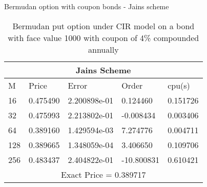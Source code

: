 \documentclass{beamer}
\begin{document}
 
  \begin{frame}{Bermudan option with coupon bonds - Jains scheme}
    \begin{table}[htp]
    \begin{tabular}{ |p{1cm}|p{1.7cm}|p{2.5cm}|p{2cm}|p{1.5cm}|  }
    
     \hline
    \multicolumn{5}{|c|}{Jains Scheme} \\
     \hline
     M & Price & Error & Order & cpu(s)\\
     \hline
     16 & 0.475490 & 2.200898e-01 & 0.124460 & 0.151726\\
    32 & 0.475993 & 2.213802e-01 & -0.008434 & 0.003406\\
    64 & 0.389160 & 1.429594e-03 & 7.274776 & 0.004711\\
    128 & 0.389665 & 1.348059e-04 & 3.406650 & 0.109706\\
    256 & 0.483437 & 2.404822e-01 & -10.800831 & 0.610421\\
     \hline
     \multicolumn{5}{|c|}{Exact Price = 0.389717} \\
     \hline
     
    \end{tabular}
    \caption{ Bermudan put option under CIR model on a bond with face value 1000 with coupon of 4\% compounded annually}

        
    \end{table}
\end{frame}
 
\end{document}
